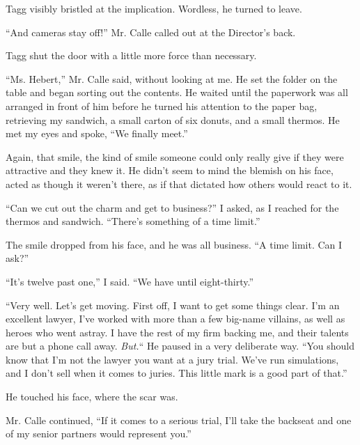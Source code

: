 Tagg visibly bristled at the implication.  Wordless, he turned to leave.



``And cameras stay off!'' Mr. Calle called out at the Director's back.



Tagg shut the door with a little more force than necessary.



``Ms. Hebert,'' Mr. Calle said, without looking at me.  He set the folder on the table and began sorting out the contents.  He waited until the paperwork was all arranged in front of him before he turned his attention to the paper bag, retrieving my sandwich, a small carton of six donuts, and a small thermos.  He met my eyes and spoke, ``We finally meet.''



Again, that smile, the kind of smile someone could only really give if they were attractive and they knew it.  He didn't seem to mind the blemish on his face, acted as though it weren't there, as if that dictated how others would react to it.



``Can we cut out the charm and get to business?'' I asked, as I reached for the thermos and sandwich.  ``There's something of a time limit.''



The smile dropped from his face, and he was all business.  ``A time limit.  Can I ask?''



``It's twelve past one,'' I said.  ``We have until eight-thirty.''



``Very well.  Let's get moving.  First off, I want to get some things clear.  I'm an excellent lawyer, I've worked with more than a few big-name villains, as well as heroes who went astray.  I have the rest of my firm backing me, and their talents are but a phone call away.  \emph{But.}``\emph{  }He paused in a very deliberate way.  ``You should know that I'm not the lawyer you want at a jury trial.  We've run simulations, and I don't sell when it comes to juries.  This little mark is a good part of that.''



He touched his face, where the scar was.



Mr. Calle continued, ``If it comes to a serious trial, I'll take the backseat and one of my senior partners would represent you.''



